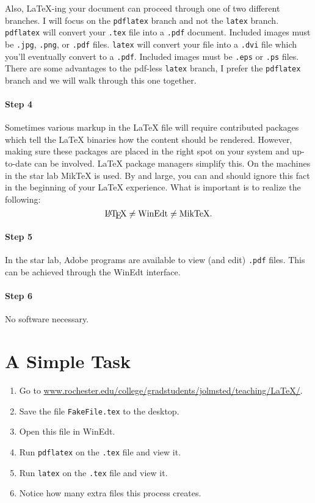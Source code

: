 \par Also, \LaTeX{}-ing your document can proceed through one of two
different branches. I will focus on the \texttt{pdflatex} branch and
not the \texttt{latex} branch. \texttt{pdflatex} will convert your
\texttt{.tex} file into a \texttt{.pdf} document. Included images must
be \texttt{.jpg}, \texttt{.png}, or \texttt{.pdf}
files. \texttt{latex} will convert your file into a \texttt{.dvi} file
which you'll eventually convert to a \texttt{.pdf}. Included images
must be \texttt{.eps} or \texttt{.ps} files. There are some advantages
to the pdf-less \texttt{latex} branch, I prefer the \texttt{pdflatex}
branch and we will walk through this one together.

\paragraph{Step 4} Sometimes various markup in the \LaTeX{} file will
require contributed packages which tell the \LaTeX{} binaries how the
content should be rendered. However, making sure these packages are
placed in the right spot on your system and up-to-date can be
involved. \LaTeX{} package managers simplify this. On the machines in
the star lab MikTeX is used. By and large, you can and should ignore
this fact in the beginning of your \LaTeX{} experience. What is
important is to realize the following:
\[
\textrm{\LaTeX{}} \neq \textrm{WinEdt} \neq \textrm{MikTeX}.
\]

\paragraph{Step 5} In the star lab, Adobe programs are available to view
(and edit) \texttt{.pdf} files. This can be achieved through the
WinEdt interface.

\paragraph{Step 6} No software necessary.

\section{A Simple Task}
\begin{enumerate}
\item Go to \url{www.rochester.edu/college/gradstudents/jolmsted/teaching/LaTeX/}.
\item Save the file \texttt{FakeFile.tex} to the desktop.
\item Open this file in WinEdt.
\item Run \texttt{pdflatex} on the \texttt{.tex} file and view it.
\item Run \texttt{latex} on the \texttt{.tex} file and view it.
\item Notice how many extra files this process creates.
\end{enumerate}

